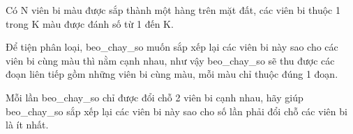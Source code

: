 Có N viên bi màu được sắp thành một hàng trên mặt đất, các viên bi thuộc 1 trong K màu được đánh số từ 1 đến K.  

   Để tiện phân loại, beo\_chay\_so muốn sắp xếp lại các viên bi này sao cho các viên bi cùng màu thì nằm cạnh nhau, như vậy beo\_chay\_so sẽ thu được các đoạn liên tiếp gồm những viên bi cùng màu, mỗi màu chỉ thuộc đúng 1 đoạn.  

   Mỗi lần beo\_chay\_so chỉ được đổi chỗ 2 viên bi cạnh nhau, hãy giúp beo\_chay\_so sắp xếp lại các viên bi này sao cho số lần phải đổi chỗ các viên bi là ít nhất.  

\